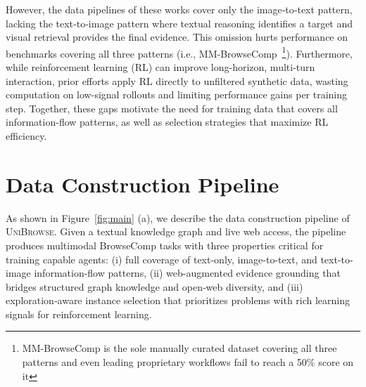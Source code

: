 \documentclass[11pt]{article}
\newcommand{\modelname}{\textsc{UniBrowse}}
\begin{document}
However, the data pipelines of these works  cover only the image‑to‑text pattern, lacking the text‑to‑image pattern where textual reasoning identifies a target and visual retrieval provides the final evidence. 
This omission hurts performance on benchmarks covering all three patterns (i.e.,  MM-BrowseComp~\citep{li2025mm}\footnote{MM-BrowseComp is the sole manually curated dataset covering all three patterns and  even leading proprietary workflows fail to reach a 50\% score  on it}). 
Furthermore, while reinforcement learning (RL) can improve long-horizon, multi-turn interaction, prior efforts apply RL directly to unfiltered synthetic data,  wasting computation on low-signal rollouts and limiting performance gains per training step. Together, these gaps motivate the need for training data that covers all information-flow patterns, as well as selection strategies that maximize RL efficiency.

\section{Data Construction Pipeline}
\label{sec:data}

As shown in Figure~\ref{fig:main} (a), we describe the data construction pipeline of \modelname . Given a textual knowledge graph and live web access, the pipeline produces multimodal BrowseComp tasks with three properties critical for training capable agents: (i) full coverage of text-only, image-to-text, and text-to-image information-flow patterns, (ii) web-augmented evidence grounding that bridges structured graph knowledge and open‑web diversity, and (iii) exploration‑aware instance selection that prioritizes problems with rich learning signals for reinforcement learning.
\end{document}
